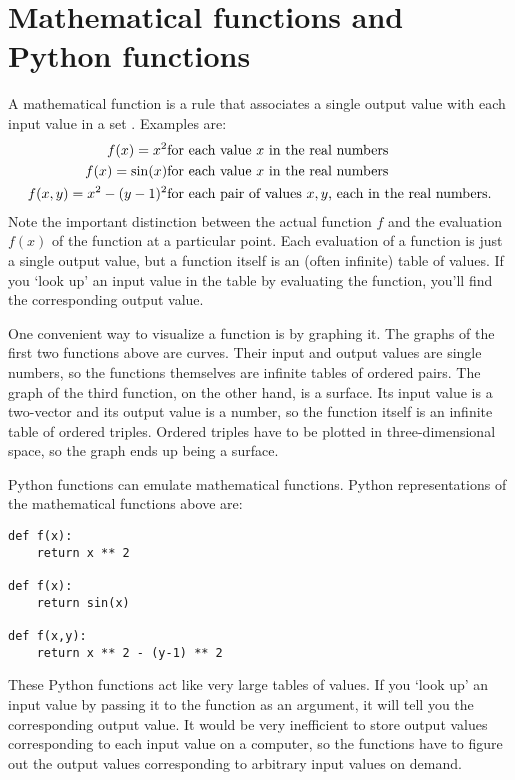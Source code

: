 
\section{Mathematical functions and Python functions}\label{sec:functions}
A mathematical function is a rule that associates a single output value with each input value in a set \cite{rudin}. Examples are:
\begin{eqnarray*}
    f(x) = x^2 & \textup{for each value $x$ in the real numbers}  \\
    f(x) = \sin(x)& \textup{for each value $x$ in the real numbers}\\
    f(x,y) = x^2 - (y-1)^2 & \textup{for each pair of values $x,y$, each in the real numbers.}
\end{eqnarray*}
Note the important distinction between the actual function $f$ and the evaluation $f(x)$ of the function at a particular point. Each evaluation of a function is just a single output value, but a function itself is an (often infinite) table of values. If you `look up' an input value in the table by evaluating the function, you'll find the corresponding output value.

One convenient way to visualize a function is by graphing it. The graphs of the first two functions above are curves. Their input and output values are single numbers, so the functions themselves are infinite tables of ordered pairs. The graph of the third function, on the other hand, is a surface. Its input value is a two-vector and its output value is a number, so the function itself is an infinite table of ordered triples. Ordered triples have to be plotted in three-dimensional space, so the graph ends up being a surface.

Python functions can emulate mathematical functions. Python representations of the mathematical functions above are:
\begin{verbatim}
def f(x):
    return x ** 2

def f(x):
    return sin(x)

def f(x,y):
    return x ** 2 - (y-1) ** 2
\end{verbatim}
These Python functions act like very large tables of values. If you `look up' an input value by passing it to the function as an argument, it will tell you the corresponding output value. It would be very inefficient to store output values corresponding to each input value on a computer, so the functions have to figure out the output values corresponding to arbitrary input values on demand.


